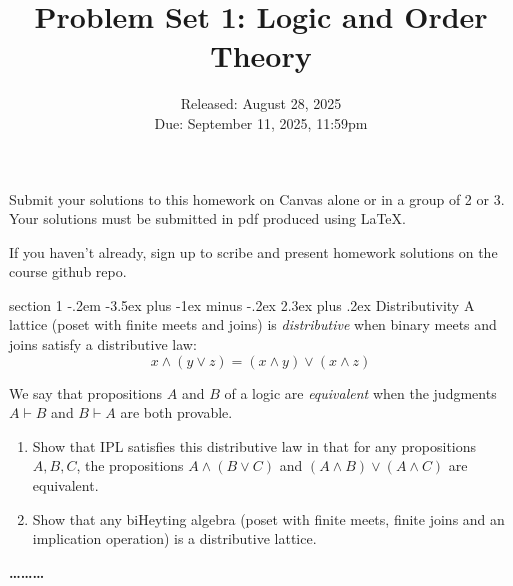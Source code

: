 \documentclass[12pt]{article}
\makeatletter
\newenvironment{problem}{\@startsection
       {section}
       {1}
       {-.2em}
       {-3.5ex plus -1ex minus -.2ex}
       {2.3ex plus .2ex}
       {\pagebreak[3]%
       \large\bf\noindent{Problem }
       }
       }
       {%
       \begin{center}\large\bf \ldots\ldots\ldots\end{center}}
\makeatother
\begin{document}
\title{Problem Set 1: Logic and Order Theory}
\date{Released: August 28, 2025\\ Due: September 11, 2025, 11:59pm}
\maketitle

Submit your solutions to this homework on Canvas alone or in a group of 2 or
3. Your solutions must be submitted in pdf produced using LaTeX.

If you haven't already, sign up to scribe and present homework
solutions on the course github repo.



\begin{problem}{Distributivity}
  A lattice (poset with finite meets and joins) is \emph{distributive}
  when binary meets and joins satisfy a distributive law:
  \[ x \wedge (y \vee z) = (x \wedge y) \vee (x \wedge z) \]

  We say that propositions $A$ and $B$ of a logic are
  \emph{equivalent} when the judgments $A \vdash B$ and $B \vdash A$
  are both provable.

  \begin{enumerate}
  \item Show that IPL satisfies this distributive law in that for any
    propositions $A, B, C$, the propositions $A \wedge (B \vee C)$ and
    $(A \wedge B) \vee (A \wedge C)$ are equivalent.
  \item Show that any biHeyting algebra (poset with finite meets, finite joins
    and an implication operation) is a distributive lattice.
  \end{enumerate}
\end{problem}
\end{document}
